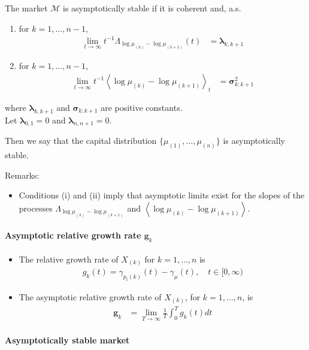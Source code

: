 \documentclass[a4paper,landscape,8pt,fleqn]{scrartcl}
\begin{document}
\begin{multicols*}{3}
The market $\mathcal{M}$ is asymptotically stable if it is coherent and, a.s.
\begin{enumerate}
\item for $k=1, \ldots, n-1$,
\begin{align*}
\lim\limits_{t \to \infty} t^{-1} \Lambda_{\log \mu_{(k)} - \log \mu_{(k+1)}}(t) &= \pmb{\lambda}_{k,k+1}
\end{align*}
\item for $k=1, \ldots, n-1$,
\begin{align*}
\lim\limits_{t \to \infty} t^{-1} \left\langle \log \mu_{(k)} - \log \mu_{(k+1)} \right\rangle_t &= \pmb{\sigma}_{k:k+1}^2
\end{align*}
\end{enumerate}
where $\pmb{\lambda}_{k,k+1}$ and $\pmb{\sigma}_{k:k+1}$ are positive constants. \\
Let $\pmb{\lambda}_{0,1} = 0$ and $\pmb{\lambda}_{n,n+1} = 0$.

Then we say that the capital distribution $\lbrace \mu_{(1)}, \ldots, \mu_{(n)} \rbrace$ is asymptotically stable.

Remarks:
\begin{itemize}
\item Conditions (i) and (ii) imply that asymptotic limits exist for the slopes of the processes $\Lambda_{\log \mu_{(k)} - \log \mu_{(k+1)}}$ and $\left\langle \log \mu_{(k)} - \log \mu_{(k+1)} \right\rangle$.
\end{itemize}

\paragraph{Asymptotic relative growth rate $\pmb{g}_k$}

\begin{itemize}
\item The relative growth rate of $X_{(k)}$ for $k=1,\ldots,n$ is
\begin{align*}
g_k(t) = \gamma_{p_t(k)}(t) - \gamma_\mu(t), \quad t \in [0,\infty)
\end{align*}
\item The asymptotic relative growth rate of $X_{(k)}$, for $k=1, \ldots, n$, is
\begin{align*}
\pmb{g}_k &= \lim\limits_{T \to \infty} \frac{1}{T} \int_0^T g_k(t) dt
\end{align*}
\end{itemize}

\paragraph{Asymptotically stable market}


\end{multicols*}
\end{document}
